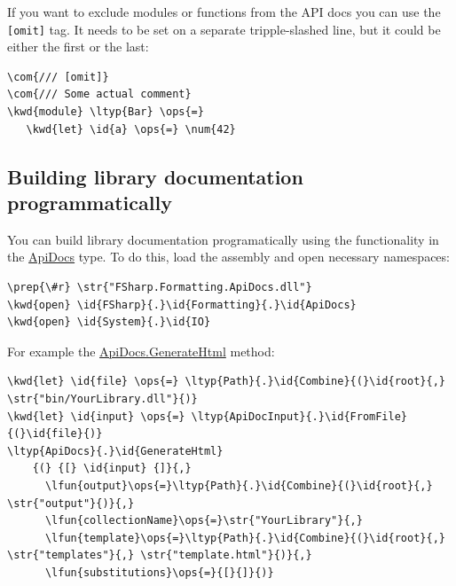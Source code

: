\documentclass{article}
\newcommand{\id}[1]{\textcolor{black}{#1}}
\newcommand{\com}[1]{\textcolor{officegreen}{#1}}
\newcommand{\kwd}[1]{\textcolor{navy}{#1}}
\newcommand{\num}[1]{\textcolor{officegreen}{#1}}
\newcommand{\ops}[1]{\textcolor{purple}{#1}}
\newcommand{\prep}[1]{\textcolor{purple}{#1}}
\newcommand{\str}[1]{\textcolor{olive}{#1}}
\begin{document}
If you want to exclude modules or functions from the API docs you can use the \texttt{[omit]} tag.
It needs to be set on a separate tripple-slashed line, but it could be either the first or the last:
\begin{Verbatim}[commandchars=\\\{\}]
\com{/// [omit]}
\com{/// Some actual comment}
\kwd{module} \ltyp{Bar} \ops{=}
   \kwd{let} \id{a} \ops{=} \num{42}
\end{Verbatim}

\subsection*{Building library documentation programmatically}



You can build library documentation programatically using the functionality
in the \href{https://fsprojects.github.io/FSharp.Formatting/reference/fsharp-formatting-apidocs-apidocs.html}{ApiDocs} type. To do this, load the assembly and open necessary namespaces:
\begin{Verbatim}[commandchars=\\\{\}]
\prep{\#r} \str{"FSharp.Formatting.ApiDocs.dll"}
\kwd{open} \id{FSharp}{.}\id{Formatting}{.}\id{ApiDocs}
\kwd{open} \id{System}{.}\id{IO}
\end{Verbatim}



For example the \href{https://fsprojects.github.io/FSharp.Formatting/reference/fsharp-formatting-apidocs-apidocs.html}{ApiDocs.GenerateHtml} method:
\begin{Verbatim}[commandchars=\\\{\}]
\kwd{let} \id{file} \ops{=} \ltyp{Path}{.}\id{Combine}{(}\id{root}{,} \str{"bin/YourLibrary.dll"}{)}
\kwd{let} \id{input} \ops{=} \ltyp{ApiDocInput}{.}\id{FromFile}{(}\id{file}{)}
\ltyp{ApiDocs}{.}\id{GenerateHtml}
    {(} {[} \id{input} {]}{,}
      \lfun{output}\ops{=}\ltyp{Path}{.}\id{Combine}{(}\id{root}{,} \str{"output"}{)}{,}
      \lfun{collectionName}\ops{=}\str{"YourLibrary"}{,}
      \lfun{template}\ops{=}\ltyp{Path}{.}\id{Combine}{(}\id{root}{,} \str{"templates"}{,} \str{"template.html"}{)}{,}
      \lfun{substitutions}\ops{=}{[}{]}{)}
\end{Verbatim}
\end{document}
